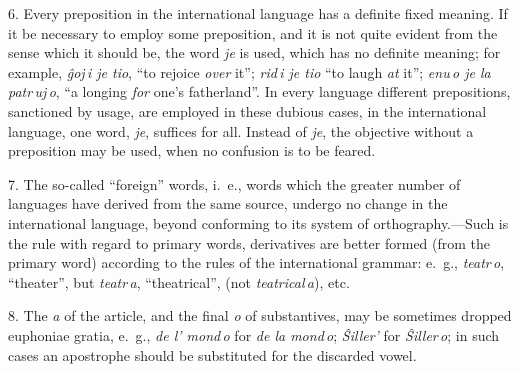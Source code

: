 6. Every preposition in the international language has a definite fixed meaning. If it be necessary to employ some preposition, and it is not quite evident from the sense which it should be, the word \emph{je} is used, which has no definite meaning; for example, \emph{ĝoj\,i je tio}, “to rejoice \emph{over} it”; \emph{rid\,i je tio} “to laugh \emph{at} it”; \emph{enu\,o je la patr\,uj\,o}, “a longing \emph{for} one’s fatherland”. In every language different prepositions, sanctioned by usage, are employed in these dubious cases, in the international language, one word, \emph{je}, suffices for all. Instead of \emph{je}, the objective without a preposition may be used, when no confusion is to be feared.

7. The so-called “foreign” words, i.~e., words which the greater number of languages have derived from the same source, undergo no change in the international language, beyond conforming to its system of orthography.---Such is the rule with regard to primary words, derivatives are better formed (from the primary word) according to the rules of the international grammar: e.~g., \emph{teatr\,o}, “theater”, but \emph{teatr\,a}, “theatrical”, (not \emph{teatrical\,a}), etc.

8. The \emph{a} of the article, and the final \emph{o} of substantives, may be sometimes dropped euphoniae gratia, e.~g., \emph{de l’ mond\,o} for \emph{de la mond\,o}; \emph{Ŝiller’} for \emph{Ŝiller\,o}; in such cases an apostrophe should be substituted for the discarded vowel. 

\sectionline